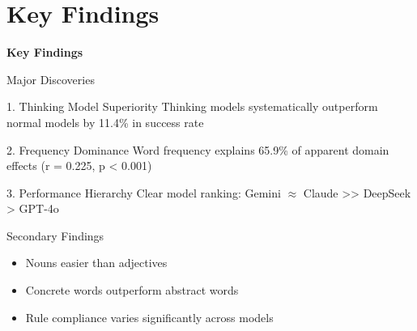 \documentclass[aspectratio=169]{beamer}
\begin{document}
\section{Key Findings}

\begin{frame}
\begin{center}
\Huge \textbf{Key Findings}
\end{center}
\end{frame}

\begin{frame}{Major Discoveries}
\begin{alertblock}{1. Thinking Model Superiority}
Thinking models systematically outperform normal models by 11.4\% in success rate
\end{alertblock}

\begin{alertblock}{2. Frequency Dominance}
Word frequency explains 65.9\% of apparent domain effects (r = 0.225, p < 0.001)
\end{alertblock}

\begin{alertblock}{3. Performance Hierarchy}
Clear model ranking: Gemini $\approx$ Claude >> DeepSeek > GPT-4o
\end{alertblock}

\begin{block}{Secondary Findings}
\begin{itemize}
    \item Nouns easier than adjectives
    \item Concrete words outperform abstract words
    \item Rule compliance varies significantly across models
\end{itemize}
\end{block}
\end{frame}
\end{document}
